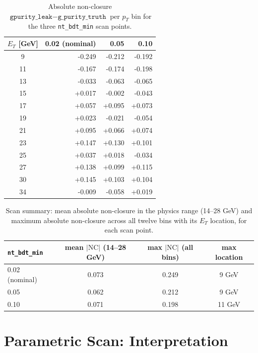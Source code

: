 \documentclass[11pt]{article}
\begin{document}
\begin{table}[ht]
  \centering
  \small
  \caption{Absolute non-closure $\texttt{gpurity\_leak} - \texttt{g\_purity\_truth}$ per $p_T$ bin for the
           three \texttt{nt\_bdt\_min} scan points.}
  \label{tab:nc_abs}
  \renewcommand{\arraystretch}{0.95}
  \begin{tabular}{c r r r}
    \toprule
    $E_T$ [GeV] & 0.02 (nominal) & 0.05 & 0.10 \\
    \midrule
    9  & -0.249 & -0.212 & -0.192 \\
    11 & -0.167 & -0.174 & -0.198 \\
    13 & -0.033 & -0.063 & -0.065 \\
    15 & +0.017 & -0.002 & -0.043 \\
    17 & +0.057 & +0.095 & +0.073 \\
    19 & +0.023 & -0.021 & -0.054 \\
    21 & +0.095 & +0.066 & +0.074 \\
    23 & +0.147 & +0.130 & +0.101 \\
    25 & +0.037 & +0.018 & -0.034 \\
    27 & +0.138 & +0.099 & +0.115 \\
    30 & +0.145 & +0.103 & +0.104 \\
    34 & -0.009 & -0.058 & +0.019 \\
    \bottomrule
  \end{tabular}
\end{table}

\begin{table}[ht]
  \centering
  \caption{Scan summary: mean absolute non-closure in the physics range (14--28 GeV) and maximum
           absolute non-closure across all twelve bins with its $E_T$ location, for each scan point.}
  \label{tab:nc_summary}
  \begin{tabular}{l c c c}
    \toprule
    \texttt{nt\_bdt\_min} & mean $|\mathrm{NC}|$ (14--28 GeV) & max $|\mathrm{NC}|$ (all bins) & max location \\
    \midrule
    0.02 (nominal) & 0.073 & 0.249 & 9 GeV \\
    0.05           & 0.062 & 0.212 & 9 GeV \\
    0.10           & 0.071 & 0.198 & 11 GeV \\
    \bottomrule
  \end{tabular}
\end{table}

\section{Parametric Scan: Interpretation}
\end{document}
